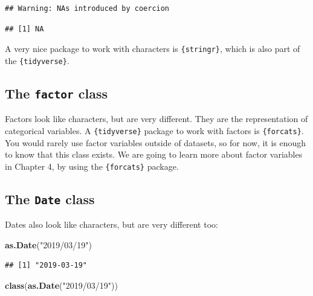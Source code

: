 \documentclass[]{gitbook}
\newenvironment{Shaded}{\begin{snugshade}}{\end{snugshade}}
\newcommand{\KeywordTok}[1]{\textcolor[rgb]{0.13,0.29,0.53}{\textbf{#1}}}
\newcommand{\NormalTok}[1]{#1}
\newcommand{\StringTok}[1]{\textcolor[rgb]{0.31,0.60,0.02}{#1}}
\begin{document}
\begin{verbatim}
## Warning: NAs introduced by coercion
\end{verbatim}

\begin{verbatim}
## [1] NA
\end{verbatim}

A very nice package to work with characters is \texttt{\{stringr\}}, which is also part of the \texttt{\{tidyverse\}}.

\hypertarget{the-factor-class}{%
\subsection{\texorpdfstring{The \texttt{factor} class}{The factor class}}\label{the-factor-class}}

Factors look like characters, but are very different. They are the representation of categorical
variables. A \texttt{\{tidyverse\}} package to work with factors is \texttt{\{forcats\}}. You would rarely use
factor variables outside of datasets, so for now, it is enough to know that this class exists.
We are going to learn more about factor variables in Chapter 4, by using the \texttt{\{forcats\}} package.

\hypertarget{the-date-class}{%
\subsection{\texorpdfstring{The \texttt{Date} class}{The Date class}}\label{the-date-class}}

Dates also look like characters, but are very different too:

\begin{Shaded}
\begin{Highlighting}[]
\KeywordTok{as.Date}\NormalTok{(}\StringTok{"2019/03/19"}\NormalTok{)}
\end{Highlighting}
\end{Shaded}

\begin{verbatim}
## [1] "2019-03-19"
\end{verbatim}

\begin{Shaded}
\begin{Highlighting}[]
\KeywordTok{class}\NormalTok{(}\KeywordTok{as.Date}\NormalTok{(}\StringTok{"2019/03/19"}\NormalTok{))}
\end{Highlighting}
\end{Shaded}
\end{document}
